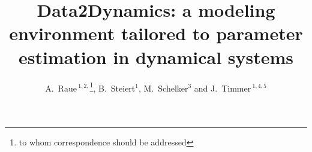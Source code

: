 \documentclass{bioinfo}
\begin{document}


\title[Data2Dynamics]{Data2Dynamics: a modeling environment tailored to parameter estimation in dynamical systems}
\author[A.~Raue \textit{et~al.}]{A.~Raue\,$^{1,2,}$\footnote{to whom correspondence should be addressed}, B.~Steiert$^{1}$, M.~Schelker$^{3}$ and J.~Timmer\,$^{1,4,5}$}
\address{$^{1}$University of Freiburg, Institute for Physics, 79104 Freiburg, Germany\\
$^{2}$Merrimack Pharmaceuticals Inc., 02139 Cambridge, MA, USA\\
$^{3}$Humboldt-University, 10115 Berlin, Germany\\
$^{4}$BIOSS Centre for Biological Signalling Studies, University of Freiburg, 79104 Freiburg, Germany\\
$^{5}$Zentrum f\"ur Biosystemanalyse (ZBSA), University of Freiburg, 79104 Freiburg, Germany}



\maketitle
\end{document}
